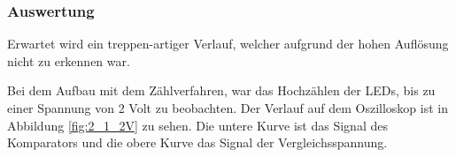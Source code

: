 \documentclass[12pt,a4paper]{article}
\begin{document}
\subsubsection*{Auswertung}

Erwartet wird ein treppen-artiger Verlauf, welcher aufgrund der hohen Auflösung nicht zu erkennen war. 

Bei dem Aufbau mit dem Zählverfahren, war das Hochzählen der LEDs, bis zu einer Spannung von 2 Volt zu beobachten. Der Verlauf auf dem Oszilloskop ist in Abbildung \ref{fig:2_1_2V} zu sehen. Die untere Kurve ist das Signal des Komparators und die obere Kurve das Signal der Vergleichsspannung.
\end{document}

